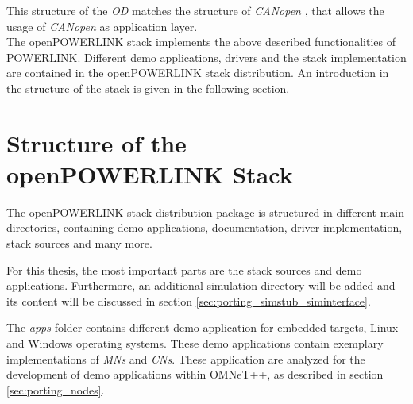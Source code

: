 This structure of the \emph{OD} matches the structure of \emph{CANopen} \cite{openpowerlink_canopen}, that allows the usage of \emph{CANopen} as application layer.
\\

The openPOWERLINK stack implements the above described functionalities of POWERLINK.
Different demo applications, drivers and the stack implementation are contained in the openPOWERLINK stack distribution.
An introduction in the structure of the stack is given in the following section.


\section{Structure of the openPOWERLINK Stack}
\label{sec:oplk_structure}
The openPOWERLINK stack distribution package is structured in different main directories, containing demo applications, documentation, driver implementation, stack sources and many more.

For this thesis, the most important parts are the stack sources and demo applications.
Furthermore, an additional simulation directory will be added and its content will be discussed in section \ref{sec:porting_simstub_siminterface}.

The \emph{apps} folder contains different demo application for embedded targets, Linux and Windows operating systems.
These demo applications contain exemplary implementations of \emph{MNs} and \emph{CNs}.
These application are analyzed for the development of demo applications within OMNeT++, as described in section \ref{sec:porting_nodes}.


